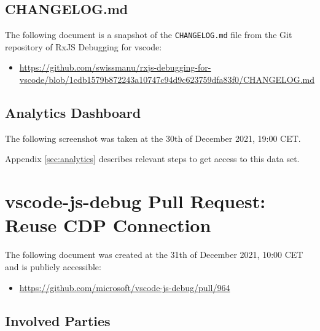 








\subsection{CHANGELOG.md \label{sec:changelog}}
The following document is a snapshot of the \texttt{CHANGELOG.md} file from the Git repository of RxJS Debugging for vscode:

\begin{itemize}
  \item \url{https://github.com/swissmanu/rxjs-debugging-for-vscode/blob/1cdb1579b872243a10747c94d9c623759dfa83f0/CHANGELOG.md}
\end{itemize}










\subsection{Analytics Dashboard \label{sec:analytics-dashboard}}
The following screenshot was taken at the 30th of December 2021, 19:00 CET.

Appendix \ref{sec:analytics} describes relevant steps to get access to this data set.









\section{vscode-js-debug Pull Request: Reuse CDP Connection \label{sec:cdp-pull-request}}
The following document was created at the 31th of December 2021, 10:00 CET and is publicly accessible:

\begin{itemize}
  \item \url{https://github.com/microsoft/vscode-js-debug/pull/964}
\end{itemize}

\subsection*{Involved Parties}

